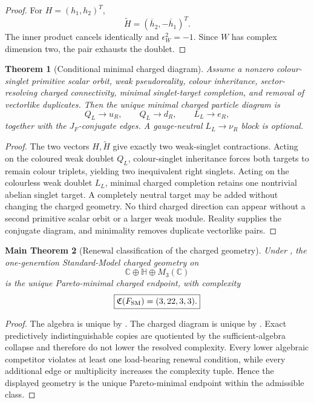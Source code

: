 \documentclass[11pt,oneside,openany]{book}
\numberwithin{equation}{chapter}
\newtheorem{theorem}{Theorem}[chapter]
\newtheorem{maintheorem}[theorem]{Main Theorem}
\theoremstyle{definition}
\theoremstyle{remark}
\newcommand{\C}{\mathbb C}
\newcommand{\HH}{\mathbb H}
\begin{document}
\begin{proof}
For $H=(h_1,h_2)^T$,
\[
 \widetilde H=(\overline h_2,-\overline h_1)^T.
\]
The inner product cancels identically and $\epsilon_W^2=-1$.  Since $W$ has complex dimension two, the pair exhausts the doublet.
\end{proof}

\begin{theorem}[Conditional minimal charged diagram]
\label{thm:minimal-diagram}
Assume a nonzero colour-singlet primitive scalar orbit, weak pseudoreality, colour inheritance, sector-resolving charged connectivity, minimal singlet-target completion, and removal of vectorlike duplicates.  Then the unique minimal charged particle diagram is
\[
 \boxed{
 Q_L\to u_R,
 \qquad
 Q_L\to d_R,
 \qquad
 L_L\to e_R,
 }
\]
together with the $J_F$-conjugate edges.  A gauge-neutral $L_L\to\nu_R$ block is optional.
\end{theorem}

\begin{proof}
The two vectors $H,\widetilde H$ give exactly two weak-singlet contractions.  Acting on the coloured weak doublet $Q_L$, colour-singlet inheritance forces both targets to remain colour triplets, yielding two inequivalent right singlets.  Acting on the colourless weak doublet $L_L$, minimal charged completion retains one nontrivial abelian singlet target.  A completely neutral target may be added without changing the charged geometry.  No third charged direction can appear without a second primitive scalar orbit or a larger weak module.  Reality supplies the conjugate diagram, and minimality removes duplicate vectorlike pairs.
\end{proof}

\begin{maintheorem}[Renewal classification of the charged geometry]
\label{thm:renewal-classification-consolidated}
Under , the one-generation Standard-Model charged geometry on
\[
 \boxed{\C\oplus\HH\oplus M_3(\C)}
\]
is the unique Pareto-minimal charged endpoint, with complexity
\[
 \boxed{\mathfrak C(F_{\rm SM})=(3,22,3,3).}
\]
\end{maintheorem}

\begin{proof}
The algebra is unique by .  The charged diagram is unique by .  Exact predictively indistinguishable copies are quotiented by the sufficient-algebra collapse and therefore do not lower the resolved complexity.  Every lower algebraic competitor violates at least one load-bearing renewal condition, while every additional edge or multiplicity increases the complexity tuple.  Hence the displayed geometry is the unique Pareto-minimal endpoint within the admissible class.
\end{proof}
\end{document}
